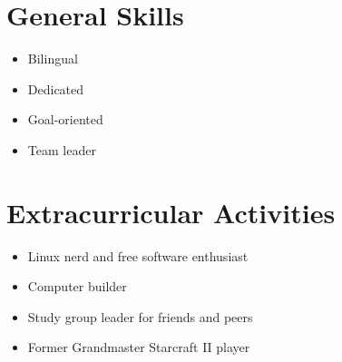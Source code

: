 \documentclass[]{article}
\providecommand{\tightlist}{%
  \setlength{\itemsep}{0pt}\setlength{\parskip}{0pt}}
\begin{document}
\hypertarget{general-skills}{%
\section{General Skills}\label{general-skills}}

\begin{itemize}
\tightlist
\item
  Bilingual
\item
  Dedicated
\item
  Goal-oriented
\item
  Team leader
\end{itemize}

\hypertarget{extracurricular-activities}{%
\section{Extracurricular Activities}\label{extracurricular-activities}}

\begin{itemize}
\tightlist
\item
  Linux nerd and free software enthusiast
\item
  Computer builder
\item
  Study group leader for friends and peers
\item
  Former Grandmaster Starcraft II player
\end{itemize}
\end{document}
